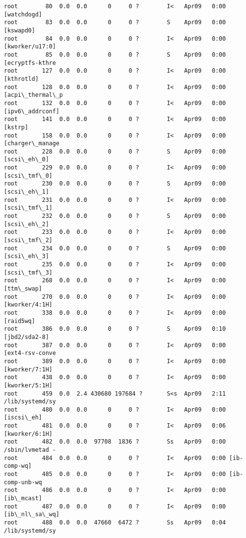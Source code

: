 \documentclass[11pt]{article}
\begin{document}
\begin{Verbatim}[commandchars=\\\{\}]
root        80  0.0  0.0      0     0 ?        I<   Apr09   0:00 [watchdogd]
root        83  0.0  0.0      0     0 ?        S    Apr09   0:00 [kswapd0]
root        84  0.0  0.0      0     0 ?        I<   Apr09   0:00 [kworker/u17:0]
root        85  0.0  0.0      0     0 ?        S    Apr09   0:00 [ecryptfs-kthre
root       127  0.0  0.0      0     0 ?        I<   Apr09   0:00 [kthrotld]
root       128  0.0  0.0      0     0 ?        I<   Apr09   0:00 [acpi\_thermal\_p
root       132  0.0  0.0      0     0 ?        I<   Apr09   0:00 [ipv6\_addrconf]
root       141  0.0  0.0      0     0 ?        I<   Apr09   0:00 [kstrp]
root       158  0.0  0.0      0     0 ?        I<   Apr09   0:00 [charger\_manage
root       228  0.0  0.0      0     0 ?        S    Apr09   0:00 [scsi\_eh\_0]
root       229  0.0  0.0      0     0 ?        I<   Apr09   0:00 [scsi\_tmf\_0]
root       230  0.0  0.0      0     0 ?        S    Apr09   0:00 [scsi\_eh\_1]
root       231  0.0  0.0      0     0 ?        I<   Apr09   0:00 [scsi\_tmf\_1]
root       232  0.0  0.0      0     0 ?        S    Apr09   0:00 [scsi\_eh\_2]
root       233  0.0  0.0      0     0 ?        I<   Apr09   0:00 [scsi\_tmf\_2]
root       234  0.0  0.0      0     0 ?        S    Apr09   0:00 [scsi\_eh\_3]
root       235  0.0  0.0      0     0 ?        I<   Apr09   0:00 [scsi\_tmf\_3]
root       268  0.0  0.0      0     0 ?        I<   Apr09   0:00 [ttm\_swap]
root       270  0.0  0.0      0     0 ?        I<   Apr09   0:00 [kworker/4:1H]
root       338  0.0  0.0      0     0 ?        I<   Apr09   0:00 [raid5wq]
root       386  0.0  0.0      0     0 ?        S    Apr09   0:10 [jbd2/sda2-8]
root       387  0.0  0.0      0     0 ?        I<   Apr09   0:00 [ext4-rsv-conve
root       389  0.0  0.0      0     0 ?        I<   Apr09   0:00 [kworker/7:1H]
root       438  0.0  0.0      0     0 ?        I<   Apr09   0:00 [kworker/5:1H]
root       459  0.0  2.4 430680 197684 ?       S<s  Apr09   2:11 /lib/systemd/sy
root       480  0.0  0.0      0     0 ?        I<   Apr09   0:00 [iscsi\_eh]
root       481  0.0  0.0      0     0 ?        I<   Apr09   0:06 [kworker/6:1H]
root       482  0.0  0.0  97708  1836 ?        Ss   Apr09   0:00 /sbin/lvmetad -
root       484  0.0  0.0      0     0 ?        I<   Apr09   0:00 [ib-comp-wq]
root       485  0.0  0.0      0     0 ?        I<   Apr09   0:00 [ib-comp-unb-wq
root       486  0.0  0.0      0     0 ?        I<   Apr09   0:00 [ib\_mcast]
root       487  0.0  0.0      0     0 ?        I<   Apr09   0:00 [ib\_nl\_sa\_wq]
root       488  0.0  0.0  47660  6472 ?        Ss   Apr09   0:04 /lib/systemd/sy

\end{Verbatim}
\end{document}
